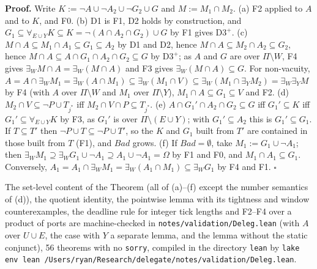 \documentclass[10pt,a4paper]{article}
\newcommand{\ex}{\exists}
\newcommand{\fa}{\forall}
\newcommand{\Dthree}{\mathrm{D3}^{+}}
\newcommand{\Bad}{\mathit{Bad}}
\newcommand{\lt}[1]{\texttt{#1}}
\begin{document}
\textbf{Proof.} Write $K:=\lnot A\cup\lnot A_2\cup\lnot G_2\cup G$ and $M:=M_1\cap M_2$. (a) F2 applied to $A$ and to $K$, and F0. (b) D1 is F1, D2 holds by construction, and $G_1\subseteq\fa_{E\cup Y}K\subseteq K=\lnot(A\cap A_2\cap G_2)\cup G$ by F1 gives $\Dthree$. (c) $M\cap A\subseteq M_1\cap A_1\subseteq G_1\subseteq A_2$ by D1 and D2, hence $M\cap A\subseteq M_2\cap A_2\subseteq G_2$, hence $M\cap A\subseteq A\cap G_1\cap A_2\cap G_2\subseteq G$ by $\Dthree$; as $A$ and $G$ are over $\Pi\setminus W$, F4 gives $\ex_W M\cap A=\ex_W(M\cap A)$ and F3 gives $\ex_W(M\cap A)\subseteq G$. For non-vacuity, $A=A\cap\ex_W M_1=\ex_W(A\cap M_1)\subseteq\ex_W(M_1\cap V)\subseteq\ex_W(M_1\cap\ex_Y M_2)=\ex_W\ex_Y M$ by F4 (with $A$ over $\Pi\setminus W$ and $M_1$ over $\Pi\setminus Y$), $M_1\cap A\subseteq G_1\subseteq V$ and F2. (d) $M_2\cap V\subseteq\lnot P\cup T_{j^*}$ iff $M_2\cap V\cap P\subseteq T_{j^*}$. (e) $A\cap G_1'\cap A_2\cap G_2\subseteq G$ iff $G_1'\subseteq K$ iff $G_1'\subseteq\fa_{E\cup Y}K$ by F3, as $G_1'$ is over $\Pi\setminus(E\cup Y)$; with $G_1'\subseteq A_2$ this is $G_1'\subseteq G_1$. If $T\subseteq T'$ then $\lnot P\cup T\subseteq\lnot P\cup T'$, so the $K$ and $G_1$ built from $T'$ are contained in those built from $T$ (F1), and $\Bad$ grows. (f) If $\Bad=\emptyset$, take $M_1:=G_1\cup\lnot A_1$; then $\ex_W M_1\supseteq\ex_W G_1\cup\lnot A_1\supseteq A_1\cup\lnot A_1=\Omega$ by F1 and F0, and $M_1\cap A_1\subseteq G_1$. Conversely, $A_1=A_1\cap\ex_W M_1=\ex_W(A_1\cap M_1)\subseteq\ex_W G_1$ by F4 and F1. \hfill$\square$

The set-level content of the Theorem (all of (a)--(f) except the number semantics of (d)), the quotient identity, the pointwise lemma with its tightness and window counterexamples, the deadline rule for integer tick lengths and F2--F4 over a product of ports are machine-checked in \lt{notes/validation/Deleg.lean} (with $A$ over $U\cup E$, the case with $Y$ a separate lemma, and the lemma without the static conjunct), 56 theorems with no \lt{sorry}, compiled in the directory \lt{lean} by \lt{lake env lean /Users/ryan/Research/delegate/notes/validation/Deleg.lean}.
\end{document}
